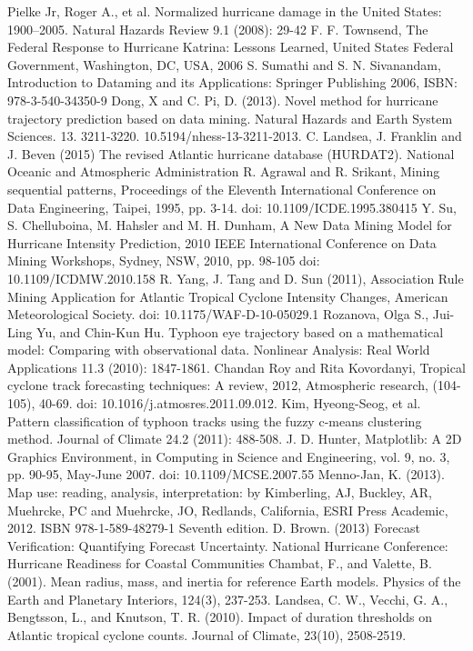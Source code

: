 \documentclass[12pt,conference]{IEEEtran}
\begin{document}
\begin{thebibliography}{1}
 Pielke Jr, Roger A., et al. Normalized hurricane damage in the United States: 1900–2005. Natural Hazards Review 9.1 (2008): 29-42
 F. F. Townsend, The Federal Response to Hurricane Katrina: Lessons Learned, United States Federal Government, Washington, DC, USA, 2006
 S. Sumathi and S. N. Sivanandam, Introduction to Dataming and its Applications: Springer Publishing 2006, ISBN: 978-3-540-34350-9
 Dong, X and C. Pi, D. (2013). Novel method for hurricane trajectory prediction based on data mining. Natural Hazards and Earth System Sciences. 13. 3211-3220. 10.5194/nhess-13-3211-2013. 
 C. Landsea, J. Franklin and J. Beven (2015) The revised Atlantic hurricane database (HURDAT2). National Oceanic and Atmospheric Administration
 R. Agrawal and R. Srikant, Mining sequential patterns, Proceedings of the Eleventh International Conference on Data Engineering, Taipei, 1995, pp. 3-14.
doi: 10.1109/ICDE.1995.380415
 Y. Su, S. Chelluboina, M. Hahsler and M. H. Dunham, A New Data Mining Model for Hurricane Intensity Prediction, 2010 IEEE International Conference on Data Mining Workshops, Sydney, NSW, 2010, pp. 98-105
doi: 10.1109/ICDMW.2010.158
 R. Yang, J. Tang and D. Sun (2011), Association Rule Mining Application for Atlantic Tropical Cyclone Intensity Changes, American Meteorological Society. doi: 10.1175/WAF-D-10-05029.1
 Rozanova, Olga S., Jui-Ling Yu, and Chin-Kun Hu. Typhoon eye trajectory based on a mathematical model: Comparing with observational data. Nonlinear Analysis: Real World Applications 11.3 (2010): 1847-1861.
 Chandan Roy and Rita Kovordanyi, Tropical cyclone track forecasting techniques: A review, 2012, Atmospheric research, (104-105), 40-69. doi: 10.1016/j.atmosres.2011.09.012.
 Kim, Hyeong-Seog, et al. Pattern classification of typhoon tracks using the fuzzy c-means clustering method. Journal of Climate 24.2 (2011): 488-508.
 J. D. Hunter, Matplotlib: A 2D Graphics Environment, in Computing in Science and Engineering, vol. 9, no. 3, pp. 90-95, May-June 2007.
doi: 10.1109/MCSE.2007.55
 Menno-Jan, K. (2013). Map use: reading, analysis, interpretation: by Kimberling, AJ, Buckley, AR, Muehrcke, PC and Muehrcke, JO, Redlands, California, ESRI Press Academic, 2012. ISBN 978-1-589-48279-1 Seventh edition.
 D. Brown. (2013) Forecast Verification: Quantifying Forecast Uncertainty. National Hurricane Conference: Hurricane Readiness for Coastal Communities
 Chambat, F., and Valette, B. (2001). Mean radius, mass, and inertia for reference Earth models. Physics of the Earth and Planetary Interiors, 124(3), 237-253.
 Landsea, C. W., Vecchi, G. A., Bengtsson, L., and Knutson, T. R. (2010). Impact of duration thresholds on Atlantic tropical cyclone counts. Journal of Climate, 23(10), 2508-2519.

\end{thebibliography}
\end{document}
